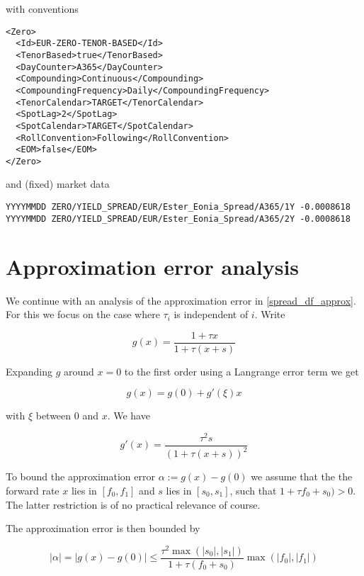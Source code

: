 \documentclass[12pt, a4paper]{article}
\begin{document}
with conventions

\begin{verbatim}
<Zero>
  <Id>EUR-ZERO-TENOR-BASED</Id>
  <TenorBased>true</TenorBased>
  <DayCounter>A365</DayCounter>
  <Compounding>Continuous</Compounding>
  <CompoundingFrequency>Daily</CompoundingFrequency>
  <TenorCalendar>TARGET</TenorCalendar>
  <SpotLag>2</SpotLag>
  <SpotCalendar>TARGET</SpotCalendar>
  <RollConvention>Following</RollConvention>
  <EOM>false</EOM>
</Zero>
\end{verbatim}

and (fixed) market data

\begin{verbatim}
YYYYMMDD ZERO/YIELD_SPREAD/EUR/Ester_Eonia_Spread/A365/1Y -0.0008618
YYYYMMDD ZERO/YIELD_SPREAD/EUR/Ester_Eonia_Spread/A365/2Y -0.0008618
\end{verbatim}

\section*{Approximation error analysis}

We continue with an analysis of the approximation error in \ref{spread_df_approx}. For this we focus on the case where
$\tau_i$ is independent of $i$. Write

\begin{equation}
  g(x) = \frac{1+\tau x}{1+\tau (x + s)}
\end{equation}

Expanding $g$ around $x=0$ to the first order using a Langrange error term we get

\begin{equation}
  g(x) = g(0) + g'(\xi) x
\end{equation}

with $\xi$ between $0$ and $x$. We have

\begin{equation}
  g'(x) = \frac{\tau^2s}{(1+\tau(x+s))^2}
\end{equation}

To bound the approximation error $\alpha := g(x) - g(0)$ we assume that the the forward rate $x$ lies in $[f_0, f_1]$
and $s$ lies in $[s_0, s_1]$, such that $1+\tau f_0 + s_0) > 0$. The latter restriction is of no practical relevance of
course.

The approximation error is then bounded by

\begin{equation}
  | \alpha | =| g(x) - g(0) | \leq \frac{\tau^2 \max(|s_0|, |s_1|)}{1+\tau(f_0+s_0)} \max(|f_0|, |f_1|)
\end{equation}
\end{document}
